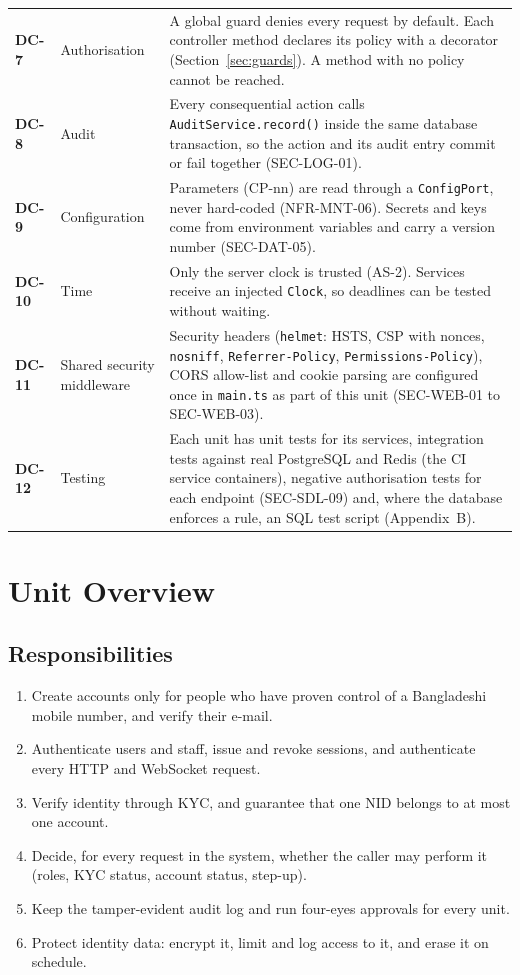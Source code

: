 \documentclass[11pt,a4paper]{article}
\newenvironment{dtable}[1]{\small\begin{longtable}{#1}}{\end{longtable}}
\begin{document}
\begin{dtable}{@{}>{\bfseries}p{1.1cm}>{\raggedright\arraybackslash}p{3.4cm}>{\raggedright\arraybackslash}p{10.6cm}@{}}
DC-7 & Authorisation & A global guard denies every request by default. Each controller method declares its policy with a decorator (Section~\ref{sec:guards}). A method with no policy cannot be reached. \\
DC-8 & Audit & Every consequential action calls \texttt{AuditService.record()} inside the same database transaction, so the action and its audit entry commit or fail together (SEC-LOG-01). \\
DC-9 & Configuration & Parameters (CP-nn) are read through a \texttt{ConfigPort}, never hard-coded (NFR-MNT-06). Secrets and keys come from environment variables and carry a version number (SEC-DAT-05). \\
DC-10 & Time & Only the server clock is trusted (AS-2). Services receive an injected \texttt{Clock}, so deadlines can be tested without waiting. \\
DC-11 & Shared security middleware & Security headers (\texttt{helmet}: HSTS, CSP with nonces, \texttt{nosniff}, \texttt{Referrer-Policy}, \texttt{Permissions-Policy}), CORS allow-list and cookie parsing are configured once in \texttt{main.ts} as part of this unit (SEC-WEB-01 to SEC-WEB-03). \\
DC-12 & Testing & Each unit has unit tests for its services, integration tests against real PostgreSQL and Redis (the CI service containers), negative authorisation tests for each endpoint (SEC-SDL-09) and, where the database enforces a rule, an SQL test script (Appendix~B). \\
\bottomrule
\end{dtable}

\section{Unit Overview}

\subsection{Responsibilities}
\begin{enumerate}[nosep]
  \item Create accounts only for people who have proven control of a Bangladeshi mobile number, and verify their e-mail.
  \item Authenticate users and staff, issue and revoke sessions, and authenticate every HTTP and WebSocket request.
  \item Verify identity through KYC, and guarantee that one NID belongs to at most one account.
  \item Decide, for every request in the system, whether the caller may perform it (roles, KYC status, account status, step-up).
  \item Keep the tamper-evident audit log and run four-eyes approvals for every unit.
  \item Protect identity data: encrypt it, limit and log access to it, and erase it on schedule.
\end{enumerate}
\end{document}
